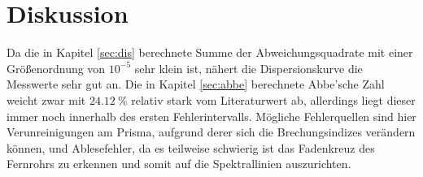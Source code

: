 \section{Diskussion}

Da die in Kapitel \ref{sec:dis} berechnete Summe der Abweichungsquadrate mit einer Größenordnung von $10^{-5}$ sehr klein ist, nähert
die Dispersionskurve die Messwerte sehr gut an. Die in Kapitel \ref{sec:abbe} berechnete Abbe'sche Zahl weicht zwar mit $\SI{24,12}{\%}$ relativ stark
vom Literaturwert ab, allerdings liegt dieser immer noch innerhalb des ersten Fehlerintervalls. Mögliche Fehlerquellen sind hier
Verunreinigungen am Prisma, aufgrund derer sich die Brechungsindizes verändern können, und Ablesefehler, da es teilweise schwierig ist
das Fadenkreuz des Fernrohrs zu erkennen und somit auf die Spektrallinien auszurichten.
